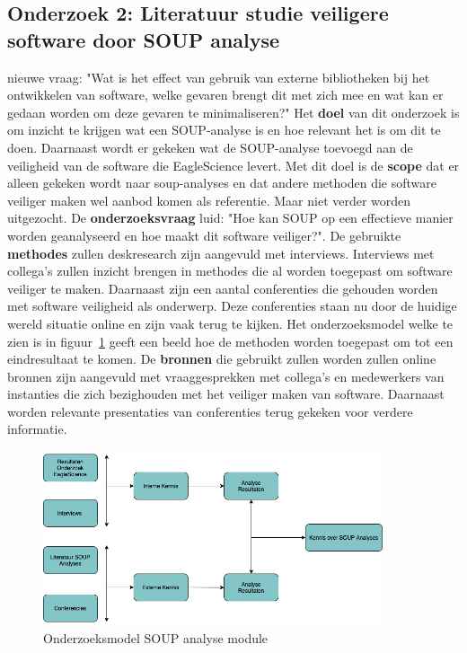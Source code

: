 \subsection{Onderzoek 2: Literatuur studie veiligere software door SOUP analyse}\label{subsec:onderzoek-literatuur-studie-soup}
nieuwe vraag: "Wat is het effect van gebruik van externe bibliotheken bij het ontwikkelen van software, welke gevaren brengt dit met zich mee en wat kan er gedaan worden om deze gevaren te minimaliseren?"
Het \textbf{doel} van dit onderzoek is om inzicht te krijgen wat een SOUP-analyse is en hoe relevant het is om dit te doen. Daarnaast wordt er gekeken wat de SOUP-analyse toevoegd aan de veiligheid van de software die EagleScience levert. Met dit doel is de \textbf{scope} dat er alleen gekeken wordt naar soup-analyses en dat andere methoden die software veiliger maken wel aanbod komen als referentie. Maar niet verder worden uitgezocht.  De \textbf{onderzoeksvraag} luid: "Hoe kan SOUP op een effectieve manier worden geanalyseerd en hoe maakt dit software veiliger?". De gebruikte \textbf{methodes} zullen deskresearch zijn aangevuld met interviews. Interviews met collega's zullen inzicht brengen in methodes die al worden toegepast om software veiliger te maken. Daarnaast zijn een aantal conferenties die gehouden worden met software veiligheid als onderwerp. Deze conferenties staan nu door de huidige wereld situatie online en zijn vaak terug te kijken. Het onderzoeksmodel welke te zien is in figuur~\ref{fig:OnderzoeksModelNoodZaakSOUP} geeft een beeld hoe de methoden worden toegepast om tot een eindresultaat te komen. De \textbf{bronnen} die gebruikt zullen worden zullen online bronnen zijn aangevuld met vraaggesprekken met collega's en medewerkers van instanties die zich bezighouden met het veiliger maken van software. Daarnaast worden relevante presentaties van conferenties terug gekeken voor verdere informatie.
\begin{figure}[htbp]
    \myfloatalign
    \includegraphics[width=10cm]{gfx/OnderzoeksmodelSOUP}
    \caption{Onderzoeksmodel SOUP analyse module}
    \label{fig:OnderzoeksModelNoodZaakSOUP}
\end{figure}

